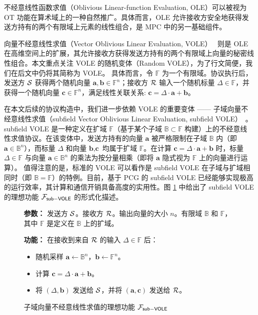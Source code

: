 不经意线性函数求值（Oblivious Linear-function Evaluation, OLE）可以被视为 OT 功能在算术域上的一种自然推广。具体而言，OLE 允许接收方安全地获得发送方持有的两个有限域上元素的线性组合，是 MPC 中的另一基础组件。

向量不经意线性求值（Vector Oblivious Linear Evaluation, VOLE）~\cite{BCGIKS19,BCGIKRS19,RRT23} 则是 OLE 在高维空间上的扩展，其允许接收方获得发送方持有的两个有限域上向量的秘密线性组合。本文重点关注 VOLE 的随机变体（Random VOLE），为了行文简便，我们在后文中仍将其简称为 VOLE。
具体而言，令 $\mathbb{F}$ 为一个有限域。协议执行后，发送方 $\mathcal{S}$ 获得两个随机向量 $\textbf{a}, \textbf{b} \in \mathbb{F}^n$；接收方 $\mathcal{R}$ 输入一个随机标量 $\Delta \in \mathbb{F}$，并获得一个随机向量 $\textbf{c} \in \mathbb{F}^n$，满足线性关联关系: $\textbf{c} = \Delta \cdot \textbf{a} + \textbf{b}$。

在本文后续的协议构造中，我们进一步依赖 VOLE 的重要变体 —— 子域向量不经意线性求值（subfield Vector Oblivious Linear Evaluation, subfield VOLE）~\cite{BCGIKS19,BCGIKRS19,RRT23}。subfield VOLE 是一种定义在扩域 $\mathbb{F}$（基于某个子域 $\mathbb{B} \subset \mathbb{F}$ 构建）上的不经意线性求值协议。在该变体中，发送方持有的向量 $\textbf{a}$ 被严格限制在子域 $\mathbb{B}$ 内（即 $\textbf{a} \in \mathbb{B}^n$），而标量 $\Delta$ 和向量 $\textbf{b}, \textbf{c}$ 均属于扩域 $\mathbb{F}$。在计算 $\textbf{c} = \Delta \cdot \textbf{a} + \textbf{b}$ 时，标量 $\Delta \in \mathbb{F}$ 与向量 $\textbf{a} \in \mathbb{B}^n$ 的乘法为按分量相乘（即将 $\textbf{a}$ 隐式视为 $\mathbb{F}$ 上的向量进行运算）。
值得注意的是，标准的 VOLE 可以看作是 subfield VOLE 在子域与扩域相同时（即 $\mathbb{B} = \mathbb{F}$）的特例。目前，基于 PCG 的 subfield VOLE 已经能够实现极高的运行效率，其计算和通信开销具备高度的实用性。图 \ref{fig:func-subvole} 中给出了 subfield VOLE 的理想功能 $\mathcal{F}_\mathsf{sub\mathsf{-}VOLE}$ 的形式化描述。

\begin{figure}[!htb]
\begin{framed}
\begin{minipage}[center]{\textwidth}
\begin{trivlist}
\item \textbf{参数：} 发送方 $\mathcal{S}$。接收方 $\mathcal{R}$。输出向量的大小 $n$。有限域 $\mathbb{B}$ 和 $\mathbb{F}$，其中 $\mathbb{F}$ 是定义在 $\mathbb{B}$ 上的扩域。
\item \textbf{功能：} 在接收到来自 $\mathcal{R}$ 的输入 $\Delta \in \mathbb{F}$ 后：
\begin{itemize}[itemsep=2pt,topsep=0pt,parsep=0pt,leftmargin=10pt]
    \item 随机采样 $\textbf{a} \gets \mathbb{B}^n$，$\textbf{b} \gets \mathbb{F}^n$。
\item 计算 $\textbf{c} = \Delta \cdot \textbf{a} + \textbf{b}$。
\item 将 $(\Delta, \textbf{b})$ 发送给 $\mathcal{S}$，并将 $(\textbf{a}, \textbf{c})$ 发送给 $\mathcal{R}$。
\end{itemize}
\end{trivlist}
\end{minipage}
\end{framed}
\caption{子域向量不经意线性求值的理想功能 $\mathcal{F}_\mathsf{sub\mathsf{-}VOLE}$}\label{fig:func-subvole}
\end{figure}

